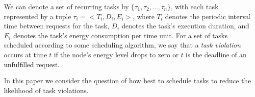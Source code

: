 We can denote a set of recurring tasks by $\{\tau_1, \tau_2, \ldots, \tau_n\}$, with each task represented by a tuple $\tau_i = <T_i, D_i, E_i>$, where $T_i$ denotes the periodic interval time between requests for the task, $D_i$ denotes the task's execution duration, and $E_i$ denotes the task's energy consumption per time unit. For a set of tasks scheduled according to some scheduling algorithm, we say that a \textit{task violation} occurs at time $t$ if the node's energy level drops to zero or $t$ is the deadline of an unfulfilled request.  



In this paper we consider the question of how best to schedule tasks to reduce the likelihood of task violations.
